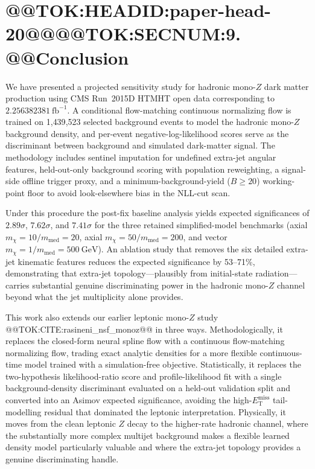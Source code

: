 \documentclass[11pt]{article}
\newcommand{\GeV}{\text{GeV}}
\newcommand{\MET}{\ensuremath{E_{\mathrm{T}}^{\mathrm{miss}}}}
\newcommand{\invfb}{\ensuremath{\mathrm{fb}^{-1}}}
\begin{document}
\section{@@TOK:HEADID:paper-head-20@@@@TOK:SECNUM:9. @@Conclusion}

We have presented a projected sensitivity study for hadronic mono-$Z$ dark
matter production using CMS Run~2015D HTMHT open data corresponding to
$2.256382381~\invfb$. A conditional flow-matching continuous normalizing
flow is trained on 1{,}439{,}523 selected background events to model the
hadronic mono-$Z$ background density, and per-event negative-log-likelihood
scores serve as the discriminant between background and simulated
dark-matter signal. The methodology includes sentinel imputation for
undefined extra-jet angular features, held-out-only background scoring with
population reweighting, a signal-side offline trigger proxy, and a
minimum-background-yield ($B\geq20$) working-point floor to avoid
look-elsewhere bias in the NLL-cut scan.

Under this procedure the post-fix baseline analysis yields expected
significances of $2.89\sigma$, $7.62\sigma$, and $7.41\sigma$ for the three
retained simplified-model benchmarks (axial $m_\chi=10/m_{\mathrm{med}}=20$,
axial $m_\chi=50/m_{\mathrm{med}}=200$, and vector
$m_\chi=1/m_{\mathrm{med}}=500~\GeV$). An ablation study that removes the
six detailed extra-jet kinematic features reduces the expected significance
by 53--71\%, demonstrating that extra-jet topology---plausibly from
initial-state radiation---carries substantial genuine discriminating power
in the hadronic mono-$Z$ channel beyond what the jet multiplicity alone
provides.

This work also extends our earlier leptonic mono-$Z$ study
@@TOK:CITE:rasineni_nsf_monoz@@ in three ways. Methodologically, it replaces the
closed-form neural spline flow with a continuous flow-matching normalizing
flow, trading exact analytic densities for a more flexible continuous-time
model trained with a simulation-free objective. Statistically, it replaces
the two-hypothesis likelihood-ratio score and profile-likelihood fit with a
single background-density discriminant evaluated on a held-out validation
split and converted into an Asimov expected significance, avoiding the
high-\MET{} tail-modelling residual that dominated the leptonic
interpretation. Physically, it moves from the clean leptonic $Z$ decay to
the higher-rate hadronic channel, where the substantially more complex
multijet background makes a flexible learned density model particularly
valuable and where the extra-jet topology provides a genuine discriminating
handle.
\end{document}

